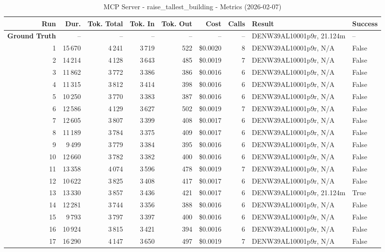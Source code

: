 \documentclass[a4paper,11pt]{article}
\begin{document}
\begin{table}[ht]
\centering
\scriptsize
\caption{MCP Server - raise\_tallest\_building - Metrics (2026-02-07)}
\label{tab:mcp\_raise\_tallest\_building\_metrics\_2026-02-07}
\begin{tabular}{r r r r r r r p{3cm} l}
\hline
Run & Dur. & Tok. Total & Tok. In & Tok. Out & Cost & Calls & Result & Success \\
\hline
\textbf{Ground Truth} & -- & -- & -- & -- & -- & -- & DENW39AL10001p9r, 21.124m & -- \\
1 & 15\,670 & 4\,241 & 3\,719 & 522 & \$0.0020 & 8 & DENW39AL10001p9r, N/A & False \\
2 & 14\,214 & 4\,128 & 3\,643 & 485 & \$0.0019 & 7 & DENW39AL10001p9r, N/A & False \\
3 & 11\,862 & 3\,772 & 3\,386 & 386 & \$0.0016 & 6 & DENW39AL10001p9r, N/A & False \\
4 & 11\,315 & 3\,812 & 3\,414 & 398 & \$0.0016 & 6 & DENW39AL10001p9r, N/A & False \\
5 & 10\,250 & 3\,770 & 3\,383 & 387 & \$0.0016 & 6 & DENW39AL10001p9r, N/A & False \\
6 & 12\,586 & 4\,129 & 3\,627 & 502 & \$0.0019 & 7 & DENW39AL10001p9r, N/A & False \\
7 & 12\,605 & 3\,807 & 3\,399 & 408 & \$0.0017 & 6 & DENW39AL10001p9r, N/A & False \\
8 & 11\,189 & 3\,784 & 3\,375 & 409 & \$0.0017 & 6 & DENW39AL10001p9r, N/A & False \\
9 & 9\,499 & 3\,779 & 3\,384 & 395 & \$0.0016 & 6 & DENW39AL10001p9r, N/A & False \\
10 & 12\,660 & 3\,782 & 3\,382 & 400 & \$0.0016 & 6 & DENW39AL10001p9r, N/A & False \\
11 & 13\,358 & 4\,074 & 3\,596 & 478 & \$0.0019 & 7 & DENW39AL10001p9r, N/A & False \\
12 & 10\,622 & 3\,825 & 3\,408 & 417 & \$0.0017 & 6 & DENW39AL10001p9r, N/A & False \\
13 & 13\,330 & 3\,857 & 3\,436 & 421 & \$0.0017 & 6 & DENW39AL10001p9r, 21.124m & True \\
14 & 12\,281 & 3\,744 & 3\,356 & 388 & \$0.0016 & 6 & DENW39AL10001p9r, N/A & False \\
15 & 9\,793 & 3\,797 & 3\,397 & 400 & \$0.0016 & 6 & DENW39AL10001p9r, N/A & False \\
16 & 10\,924 & 3\,815 & 3\,421 & 394 & \$0.0016 & 6 & DENW39AL10001p9r, N/A & False \\
17 & 16\,290 & 4\,147 & 3\,650 & 497 & \$0.0019 & 7 & DENW39AL10001p9r, N/A & False \\

\end{tabular}
\end{table}
\end{document}
